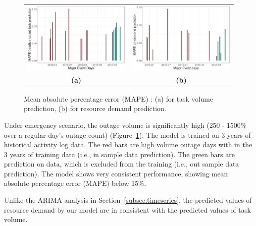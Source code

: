 \documentclass[twoside,leqno,twocolumn]{article}
\begin{document}
\begin{figure}
    \centering
	\begin{tabular}{cc}
		\includegraphics[width=7cm]{fig6a} & \includegraphics[width=7cm]{fig6b} \\
		{\Large \bf (a)} & {\Large \bf (b)} \\
	\end{tabular}
    \caption{Mean absolute percentage error (MAPE) : (a) for task volume prediction, (b) for resource demand prediction.}
    \label{fig6}
\end{figure}

Under emergency scenario, the outage volume is significantly high (250 - 1500\% over a regular day's outage count) (Figure~\ref{fig6}). The model is trained on 3 years of historical activity log data. The red bars are high volume outage days with in the 3 years of training data (i.e., in sample data prediction). The green bars are prediction on data, which is excluded from the training (i.e., out sample data prediction). The model shows very consistent performance, showing mean absolute percentage error (MAPE) below 15\%. 
\par 
Unlike the ARIMA analysis in Section~\ref{subsec:timeseries}, the predicted values of resource demand by our model are in consistent with the predicted values of task volume.
\end{document}
